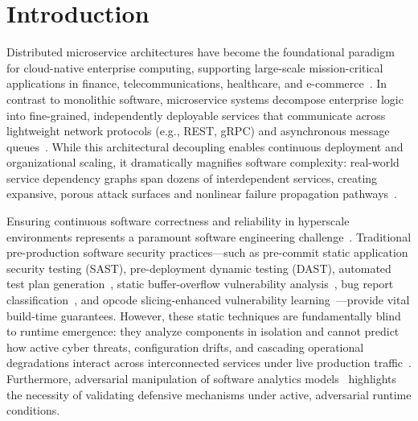 \documentclass[ASNA,twocolumn]{USG}
\begin{document}
\maketitle

\section{Introduction}
\label{sec:introduction}

Distributed microservice architectures have become the foundational paradigm for cloud-native enterprise computing, supporting large-scale mission-critical applications in finance, telecommunications, healthcare, and e-commerce~\cite{basiri2016chaos, aderaldo2025declarative, soldani2023microservice}. In contrast to monolithic software, microservice systems decompose enterprise logic into fine-grained, independently deployable services that communicate across lightweight network protocols (e.g., REST, gRPC) and asynchronous message queues~\cite{taibi2021microservice, camacho2022chaos}. While this architectural decoupling enables continuous deployment and organizational scaling, it dramatically magnifies software complexity: real-world service dependency graphs span dozens of interdependent services, creating expansive, porous attack surfaces and nonlinear failure propagation pathways~\cite{esen2025chaos, myrbakken2020security}.

Ensuring continuous software correctness and reliability in hyperscale environments represents a paramount software engineering challenge~\cite{brooker2025systems}. Traditional pre-production software security practices—such as pre-commit static application security testing (SAST), pre-deployment dynamic testing (DAST), automated test plan generation~\cite{haldar2026testplan}, static buffer-overflow vulnerability analysis~\cite{huang2026cotstatic}, bug report classification~\cite{du2024llmbrc}, and opcode slicing-enhanced vulnerability learning~\cite{tong2026osel}—provide vital build-time guarantees. However, these static techniques are fundamentally blind to runtime emergence: they analyze components in isolation and cannot predict how active cyber threats, configuration drifts, and cascading operational degradations interact across interconnected services under live production traffic~\cite{shortridge2023security, owotogbe2025chaos}. Furthermore, adversarial manipulation of software analytics models~\cite{awal2025adversarial} highlights the necessity of validating defensive mechanisms under active, adversarial runtime conditions.
\end{document}
